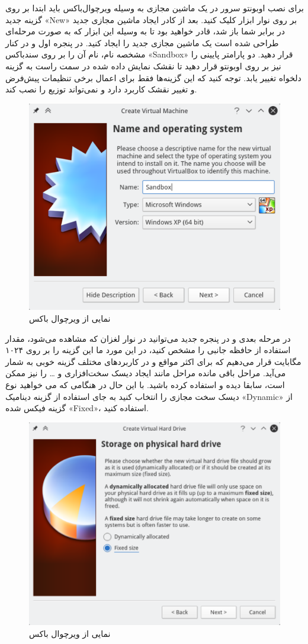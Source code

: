 برای نصب اوبونتو سرور در یک ماشین مجازی به وسیله ویرچوال‌باکس باید ابتدا بر روی گزینه جدید «New» بر روی نوار ابزار کلیک کنید. بعد از کادر ایجاد ماشین مجازی جدید در برابر شما باز شد، قادر خواهید بود تا به وسیله این ابزار که به صورت مرحله‌ای طراحی شده است یک ماشین مجازی جدید را ایجاد کنید. در پنجره اول و در کنار مشخصه نام، نام آن را بر روی سندباکس «Sandbox» قرار دهید. دو پارامتر پایینی را نیز بر روی اوبونتو قرار دهید تا نقشک نمایش داده شده در سمت راست به گزینه دلخواه تغییر یابد. توجه کنید که این گزینه‌ها فقط برای اعمال برخی تنظیمات پیش‌فرض و تغییر نقشک کاربرد دارد و نمی‌تواند توزیع را نصب کند.
\begin{figure}
    \includegraphics[width=.9\textwidth ,height=.65\textwidth]{Pic/VBox1}
    \caption{ نمایی از ویرچوال باکس}
    \label{VBOX1}
\end{figure}

در مرحله بعدی و در پنجره جدید می‌توانید در نوار لغزان که مشاهده می‌شود، مقدار استفاده از حافظه جانبی را مشخص کنید، در این مورد ما این گزینه را بر روی ۱۰۲۴ مگابایت قرار می‌دهیم که برای اکثر مواقع و در کاربردهای مختلف گزینه خوبی به شمار می‌آید. مراحل باقی مانده مراحل مانند ایجاد دیسک سخت‌افزاری و … را نیز ممکن است، سابقا دیده و استفاده کرده باشید. با این حال در هنگامی که می خواهید نوع دیسک سخت مجازی را انتخاب کنید به جای استفاده از گزینه دینامیک «Dynamic» از گزینه فیکس شده «Fixed»، استفاده کنید.
\begin{figure}
    \includegraphics[width=.9\textwidth ,height=.65\textwidth]{Pic/VBox2}
    \caption{ نمایی از ویرچوال باکس}
    \label{VBOX2}
\end{figure}

